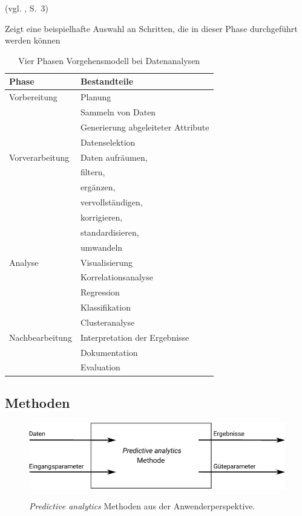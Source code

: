 (vgl. \cite{Runkler}, S.~3)

Zeigt eine beispielhafte Auswahl an Schritten, die in dieser Phase durchgeführt
werden können

\begin{table}
\centering
\caption{Vier Phasen Vorgehensmodell bei Datenanalysen}
\label{tab:Vier_Phasen}
\begin{tabular}{ |l|l| }
\hline
\textbf{Phase} & \textbf{Bestandteile} \\
\hline
Vorbereitung & Planung \\
  & Sammeln von Daten \\
  & Generierung abgeleiteter Attribute \\
  & Datenselektion \\
\hline
Vorverarbeitung & Daten aufräumen, \\
  & filtern, \\
  & ergänzen, \\
  & vervollständigen, \\
  & korrigieren, \\
  & standardisieren, \\
  & umwandeln \\
\hline
Analyse & Visualisierung \\
  & Korrelationsanalyse \\
  & Regression \\
  & Klassifikation \\
  & Clusteranalyse \\
\hline
Nachbearbeitung & Interpretation der Ergebnisse \\
  & Dokumentation \\
  & Evaluation \\
\hline
\end{tabular}
\end{table}


\subsection{Methoden}

\begin{figure}%
\centering
\caption{\emph{Predictive analytics} Methoden aus der Anwenderperspektive.}
\includegraphics[scale=1.0]{Grafiken/PA_Methoden_Ink.pdf} 
\label{pic:PA_Methoden}
\end{figure}

